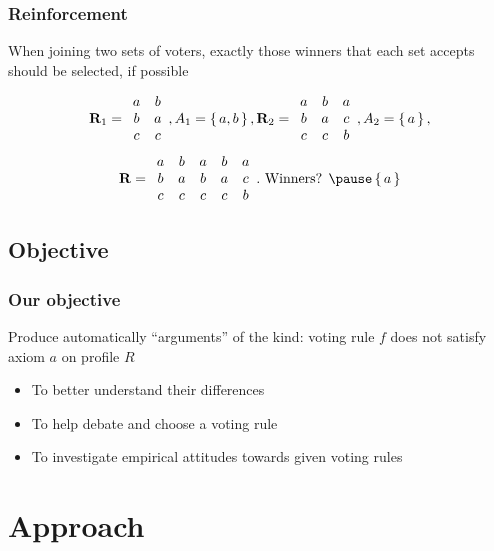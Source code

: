 \documentclass[french,english]{beamer}
\begin{document}
\begin{frame}
	\frametitle{Reinforcement}
	\begin{definition}[Reinforcement]
		When joining two sets of voters, exactly those winners that each set accepts should be selected, if possible
	\end{definition}
	\begin{example}
		\begin{equation}
			\mathbf{R}_1 =
			\begin{array}{cc}
				a&b\\
				b&a\\
				c&c\\
			\end{array},
			A_1 = \set{a, b},
			\mathbf{R}_2 =
			\begin{array}{ccc}
				a&b&a\\
				b&a&c\\
				c&c&b\\
			\end{array},
			A_2 = \set{a},
		\end{equation}
		\begin{equation}
			\prof =
			\begin{array}{ccccc}
				a&b&a&b&a\\
				b&a&b&a&c\\
				c&c&c&c&b\\
			\end{array}.
			\text{ Winners? }
			\pause
			\set{a}
		\end{equation}
	\end{example}
\end{frame}

\subsection{Objective}
\begin{frame}
	\frametitle{Our objective}
	Produce automatically “arguments” of the kind: voting rule $f$ does not satisfy axiom $a$ on profile $R$
	\begin{itemize}
		\item To better understand their differences
		\item To help debate and choose a voting rule
		\item To investigate empirical attitudes towards given voting rules
	\end{itemize}
\end{frame}

\section{Approach}
\end{document}
